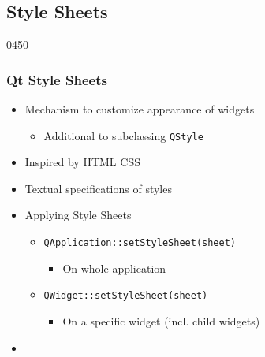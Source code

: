 %
%
%
%

\subsection{Style Sheets}\label{style_sheets}

\begin{slide}{0450}\frametitle{Qt Style Sheets}
\begin{itemize}
\item Mechanism to customize appearance of widgets
  \begin{itemize}
  \item Additional to subclassing \texttt{QStyle}
  \end{itemize}
\item Inspired by HTML CSS
\item Textual specifications of styles
\item Applying Style Sheets
  \begin{itemize}
  \item \texttt{QApplication::setStyleSheet(sheet)}
    \begin{itemize}
    \item On whole application
    \end{itemize}
  \item \texttt{QWidget::setStyleSheet(sheet)}
    \begin{itemize}
    \item On a specific widget (incl. child widgets)
    \end{itemize}
 \end{itemize}
\item[] 
\end{itemize}
\end{slide}

